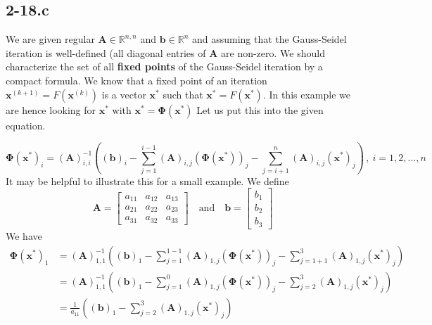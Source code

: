 \documentclass{article}
\newcommand\xkn{\mathbf{x}^{\left(k+1\right)}}
\newcommand\xk{\mathbf{x}^{\left(k\right)}}
\newcommand\A{\mathbf{A}}
\begin{document}
\subsection*{2-18.c}
We are given regular $\mathbf{A}\in\mathbb{R}^{n,n}$ and $\mathbf{b}\in \mathbb{R}^{n}$ and assuming that the Gauss-Seidel iteration is well-defined (all diagonal entries of $\mathbf{A}$ are non-zero. We should characterize the set of all \textbf{fixed points} of the Gauss-Seidel iteration by a compact formula. We know that a fixed point of an iteration $\xkn = F\left(\xk\right)$ is a vector $\mathbf{x}^{*}$ such that $\mathbf{x}^{*} = F\left(\mathbf{x}^{*}\right)$. In this example we are hence looking for $\mathbf{x}^{*}$ with $\mathbf{x}^{*} = \mathbf{\Phi}\left(\mathbf{x}^{*}\right)$ Let us put this into the given equation.

\begin{equation*}
   \mathbf{\Phi}\left(\mathbf{x}^{*}\right)_{i} = \left(\A\right)_{i,i}^{-1}\left(\left(\mathbf{b}\right)_{i} - \sum_{j=1}^{i-1}\left(\mathbf{A}\right)_{i,j}\left(\mathbf{\Phi}\left(\mathbf{x}^{*}\right)\right)_{j} - \sum_{j=i+1}^{n}\left(\A\right)_{i,j}\left(\mathbf{x}^{*}\right)_{j}\right)\,,\: i=1,2,\dots,n 
\end{equation*}
It may be helpful to illustrate this for a small example. We define 
\begin{equation*}
    \mathbf{A} = 
    \begin{bmatrix}
    a_{11} & a_{12} & a_{13} \\
    a_{21} & a_{22} & a_{23} \\
    a_{31} & a_{32} & a_{33}
    \end{bmatrix} \quad \text{and} \quad \mathbf{b} = 
    \begin{bmatrix}
        b_{1} \\ b_{2} \\ b_{3}
    \end{bmatrix}
\end{equation*}
We have 
\begin{align*}
    \mathbf{\Phi}\left(\mathbf{x}^{*}\right)_{1} &= \left(\A\right)_{1,1}^{-1}\left(\left(\mathbf{b}\right)_{1} - \sum_{j=1}^{1-1}\left(\mathbf{A}\right)_{1,j}\left(\mathbf{\Phi}\left(\mathbf{x}^{*}\right)\right)_{j} - \sum_{j=1+1}^{3}\left(\A\right)_{1,j}\left(\mathbf{x}^{*}\right)_{j}\right) \\
    &=\left(\A\right)_{1,1}^{-1}\left(\left(\mathbf{b}\right)_{1} - \sum_{j=1}^{0}\left(\mathbf{A}\right)_{1,j}\left(\mathbf{\Phi}\left(\mathbf{x}^{*}\right)\right)_{j} - \sum_{j=2}^{3}\left(\A\right)_{1,j}\left(\mathbf{x}^{*}\right)_{j}\right)  \\
    &=\frac{1}{a_{11}}\left(\left(\mathbf{b}\right)_{1} - \sum_{j=2}^{3}\left(\A\right)_{1,j}\left(\mathbf{x}^{*}\right)_{j}\right) 
\end{align*}
\end{document}
